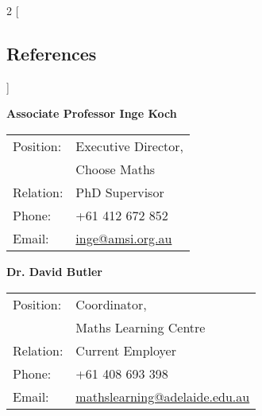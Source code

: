 \documentclass[a4paper,12pt]{report}
\begin{document}
\begin{multicols}{2}
[
\subsection*{References}
]

\begin{flushleft}
\textbf{Associate Professor Inge Koch} \\[2pt]
\begin{tabular}{ll}
Position: & Executive Director, \\
	    & Choose Maths \\
Relation: & PhD Supervisor \\
Phone:    & +61 412 672 852 \\
Email:      & \href{mailto:inge@amsi.org.au}{inge@amsi.org.au} \\
\end{tabular}
\end{flushleft}


\begin{flushleft}
\textbf{Dr. David Butler} \\[4pt]
\begin{tabular}{ll}
Position: & Coordinator, \\
	    & Maths Learning Centre \\
Relation: & Current Employer \\
Phone:    & +61 408 693 398 \\
Email:      & \href{mailto:mathslearning@adelaide.edu.au}{mathslearning@adelaide.edu.au } \\
\end{tabular}
\end{flushleft}

\end{multicols}
\end{document}
